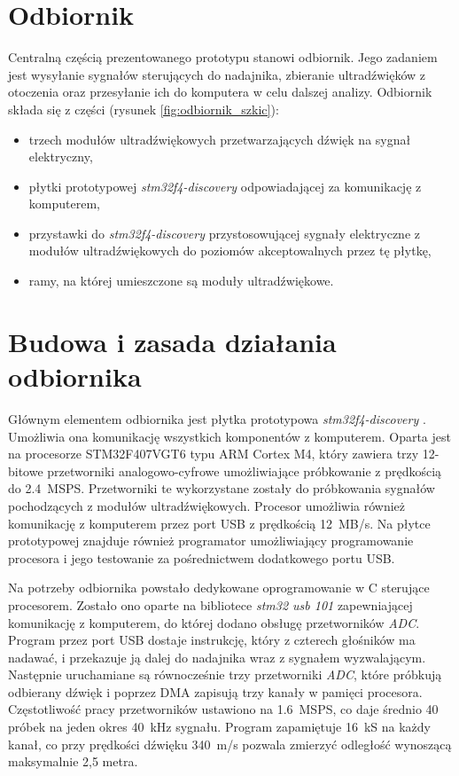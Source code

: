 \section{Odbiornik}

Centralną częścią prezentowanego prototypu stanowi odbiornik.
Jego zadaniem jest wysyłanie sygnałów sterujących do nadajnika, zbieranie ultradźwięków z otoczenia oraz przesyłanie 
ich do komputera w celu dalszej analizy.
Odbiornik składa się z części (rysunek \ref{fig:odbiornik_szkic}):

\begin{itemize}
 \item trzech modułów ultradźwiękowych przetwarzających dźwięk na sygnał elektryczny,
 \item płytki prototypowej \textit{stm32f4-discovery} \cite{bib:stm32f4Discovery} odpowiadającej za komunikację z komputerem,
 \item przystawki do \textit{stm32f4-discovery} przystosowującej sygnały elektryczne z modułów ultradźwiękowych
  do poziomów akceptowalnych przez tę płytkę,
 \item ramy, na której umieszczone są moduły ultradźwiękowe.
\end{itemize}




\section{Budowa i zasada działania odbiornika}

Głównym elementem odbiornika jest płytka prototypowa \textit{stm32f4-discovery} \cite{bib:stm32f4Discovery}.
 Umożliwia ona komunikację wszystkich komponentów z komputerem.
Oparta jest na procesorze STM32F407VGT6 \cite{bib:stm32f407} typu ARM Cortex M4, 
który zawiera trzy 12-bitowe przetworniki
analogowo-cyfrowe umożliwiające próbkowanie z prędkością do \SI{2,4}{MSPS}. Przetworniki te wykorzystane zostały do próbkowania
sygnałów pochodzących z modułów ultradźwiękowych. Procesor umożliwia również komunikację z komputerem przez 
port USB z prędkością \SI{12}{MB/s}. Na płytce prototypowej znajduje również programator
umożliwiający programowanie procesora i jego testowanie za pośrednictwem dodatkowego portu USB.

Na potrzeby odbiornika powstało dedykowane oprogramowanie w C sterujące procesorem.
Zostało ono oparte na bibliotece \textit{stm32 usb 101} \cite{bib:stm32_usb_101}
zapewniającej komunikację z komputerem, do której dodano obsługę przetworników \textit{ADC}.
Program przez port USB dostaje instrukcję, który z czterech głośników ma nadawać, i przekazuje ją
dalej do nadajnika wraz z sygnałem wyzwalającym. Następnie uruchamiane są równocześnie trzy przetworniki \textit{ADC}, które 
próbkują odbierany dźwięk i poprzez DMA zapisują trzy kanały w pamięci procesora.
Częstotliwość pracy przetworników ustawiono na \SI{1,6}{MSPS}, co daje średnio 40 próbek na jeden okres \SI{40}{kHz} sygnału.
Program zapamiętuje \SI{16}{kS} na każdy kanał, co przy prędkości dźwięku \SI{340}{m/s} pozwala zmierzyć odległość
wynoszącą maksymalnie 2,5 metra.

